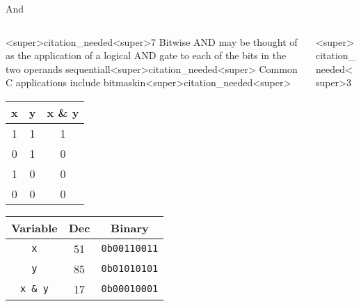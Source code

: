 \documentclass[11pt]{beamer}
\begin{document}
\begin{frame}{And}
\begin{columns}
\begin{column}{<super>citation_needed<super>7\textwidth}
Bitwise AND may be thought of as the application of a logical AND gate to each of the bits in the two operands sequentiall<super>citation_needed<super> Common C applications include bitmaskin<super>citation_needed<super>   
\center
\begin{tabular}{| c | c | c |}
\hline
x & y & x \& y \\ \hline
1 & 1 & 1 \\ \hline
0 & 1 & 0 \\ \hline
1 & 0 & 0 \\ \hline
0 & 0 & 0 \\ \hline
\end{tabular}

\begin{tabular}{| c | c | c |}
\hline
Variable & Dec & Binary \\ \hline
\texttt{x} & 51 & \texttt{0b00110011} \\ \hline
\texttt{y} & 85 & \texttt{0b01010101} \\ \hline
\texttt{x \& y} & 17 & \texttt{0b00010001} \\ \hline
\end{tabular}

\end{column}
\begin{column}{<super>citation_needed<super>3\textwidth}
\center
\

\
\end{column}
\end{columns}
\end{frame}
\end{document}

